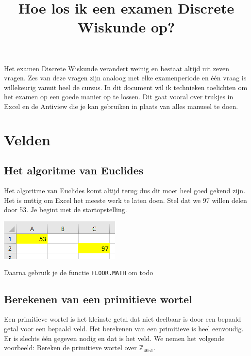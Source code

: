 \documentclass{article}
\def\warning#1{\color{red} #1 \color{black}}
\begin{document}
\title{Hoe los ik een examen Discrete Wiskunde op?}
\date{}
\author{}
\maketitle

\tableofcontents


Het examen Discrete Wiskunde verandert weinig en bestaat altijd uit zeven vragen. Zes van deze vragen zijn analoog met elke examenperiode en één vraag is willekeurig vanuit heel de cursus. In dit document wil ik technieken toelichten om het examen op een goede manier op te lossen. Dit gaat vooral over trukjes in Excel en de Antiview die je kan gebruiken in plaats van alles manueel te doen. 

\section{Velden}
\subsection{Het algoritme van Euclides}
Het algoritme van Euclides komt altijd terug dus dit moet heel goed gekend zijn. Het is nuttig om Excel het meeste werk te laten doen. Stel dat we 97 willen delen door 53. Je begint met de startopstelling.
 \begin{center}
  \includegraphics{euclidische_deling_1}
  \label{fig:euclidische_deling_1}
 \end{center}
Daarna gebruik je de functie \texttt{FLOOR.MATH} om \warning{todo}


\subsection{Berekenen van een primitieve wortel}
Een primitieve wortel is het kleinste getal dat niet deelbaar is door een bepaald getal voor een bepaald veld. Het berekenen van een primitieve is heel eenvoudig. 
Er is slechts één gegeven nodig en dat is het veld. We nemen het volgende voorbeeld: Bereken de primitieve wortel over $\mathbb{Z}_{4051}.$
\end{document}
